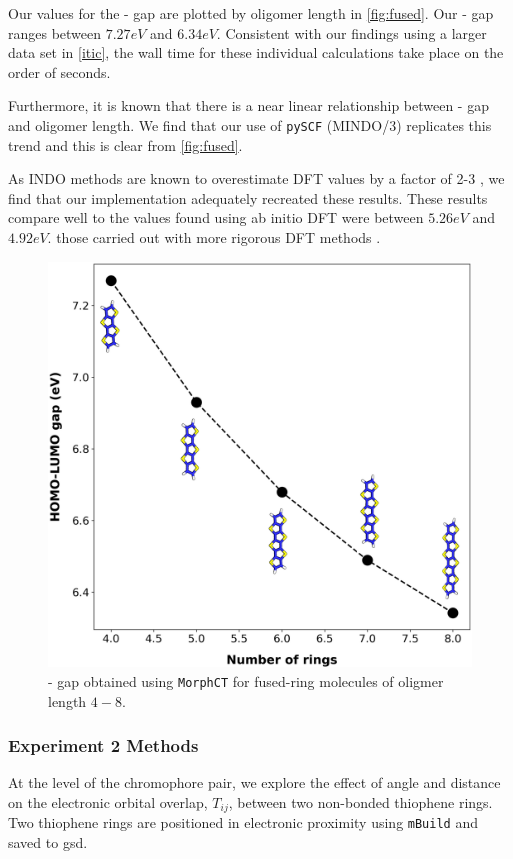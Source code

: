 Our values for the - gap are plotted by oligomer length in \autoref{fig:fused}. 
Our - gap ranges between $7.27eV$ and $6.34eV$. Consistent with our findings using a larger data set
in \autoref{itic}, the wall time for these individual calculations take place on the order of seconds. 

Furthermore, it is known that there is a near linear
relationship between - gap and oligomer length. We find that our use of \texttt{pySCF} (MINDO/3) replicates
this trend and this is clear from \autoref{fig:fused}.

As INDO methods are known to overestimate DFT values by a factor of 2-3 \cite{Gorelsky2001}, we find that our
implementation adequately recreated these results.
These results compare well to the values found using ab initio DFT were between $5.26eV$ and $4.92eV$. 
 those carried out with more rigorous DFT methods \cite{Arago2010}.

\begin{figure}
  \center
  \includegraphics[width = .6\textwidth]{figures/fused-ring-figure.png}
  \caption{- gap obtained using \texttt{MorphCT} for fused-ring molecules of oligmer length $4-8$.}
  \label{fig:fused}
\end{figure}

\subsubsection{Experiment 2 Methods}

At the level of the chromophore pair, we explore the effect of angle and distance on the electronic orbital
overlap, $T_{ij}$, between two non-bonded thiophene rings.
Two thiophene rings are positioned in electronic proximity using \texttt{mBuild} and saved to gsd. 

